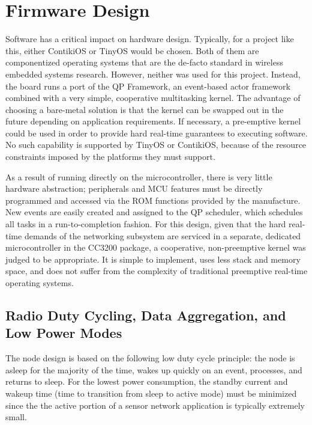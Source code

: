\chapter{Firmware Design}

Software has a critical impact on hardware design. Typically, for a project like this, either ContikiOS\cite{dunkels2011contiki} or TinyOS\cite{levis2005tinyos} would be chosen. Both of them are componentized operating systems that are the de-facto standard in wireless embedded systems research. However, neither was used for this project. Instead, the board runs a port of the QP Framework\cite{samek2008practical}, an event-based actor framework combined with a very simple, cooperative multitasking kernel. The advantage of choosing a bare-metal solution is that the kernel can be swapped out in the future depending on application requirements. If necessary, a pre-emptive kernel could be used in order to provide hard real-time guarantees to executing software. No such capability is supported by TinyOS or ContikiOS, because of the resource constraints imposed by the platforms they must support.

As a result of running directly on the microcontroller, there is very little hardware abstraction; peripherals and MCU features must be directly programmed and accessed via the ROM functions provided by the manufacture. New events are easily created and assigned to the QP scheduler, which schedules all tasks in a run-to-completion fashion. For this design, given that the hard real-time demands of the networking subsystem are serviced in a separate, dedicated microcontroller in the CC3200 package, a cooperative, non-preemptive kernel was judged to be appropriate. It is simple to implement, uses less stack and memory space, and does not suffer from the complexity of traditional preemptive real-time operating systems.
 
\section{Radio Duty Cycling, Data Aggregation, and Low Power Modes}

The node design is based on the following low duty cycle principle: the node is asleep for the majority of the time, wakes up quickly on an event, processes, and returns to sleep. For the lowest power consumption, the standby current and wakeup time (time to transition from sleep to active mode) must be minimized\cite{puccinelli2005wireless} since the the active portion of a sensor network application is typically extremely small\cite{shnayder2004simulating}. 

